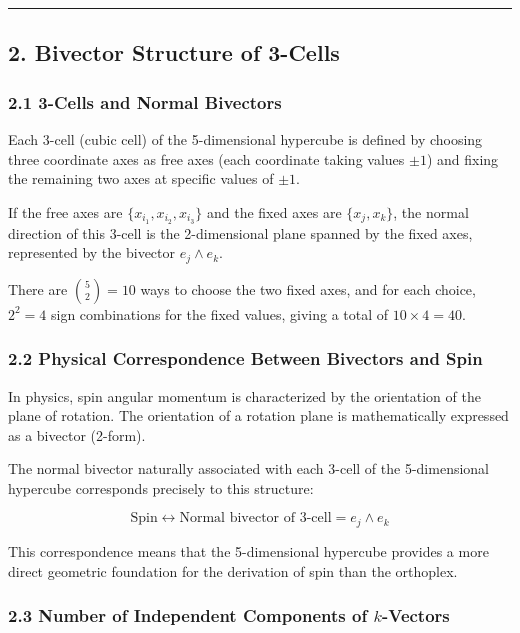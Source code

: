 \documentclass[a4paper,11pt]{article}
\begin{document}
\begin{center}\rule{0.5\linewidth}{0.5pt}\end{center}

\subsection*{2. Bivector Structure of 3-Cells}

\subsubsection*{2.1 3-Cells and Normal Bivectors}

Each 3-cell (cubic cell) of the 5-dimensional hypercube is defined by choosing three coordinate axes as free axes (each coordinate taking values $\pm 1$) and fixing the remaining two axes at specific values of $\pm 1$.

If the free axes are $\{x_{i_1}, x_{i_2}, x_{i_3}\}$ and the fixed axes are $\{x_j, x_k\}$, the normal direction of this 3-cell is the 2-dimensional plane spanned by the fixed axes, represented by the bivector $e_j \wedge e_k$.

There are $\binom{5}{2} = 10$ ways to choose the two fixed axes, and for each choice, $2^2 = 4$ sign combinations for the fixed values, giving a total of $10 \times 4 = 40$.

\subsubsection*{2.2 Physical Correspondence Between Bivectors and Spin}

In physics, spin angular momentum is characterized by the orientation of the plane of rotation. The orientation of a rotation plane is mathematically expressed as a bivector (2-form).

The normal bivector naturally associated with each 3-cell of the 5-dimensional hypercube corresponds precisely to this structure:

\[\text{Spin} \longleftrightarrow \text{Normal bivector of 3-cell} = e_j \wedge e_k\]

This correspondence means that the 5-dimensional hypercube provides a more direct geometric foundation for the derivation of spin than the orthoplex.

\subsubsection*{2.3 Number of Independent Components of $k$-Vectors}
\end{document}
